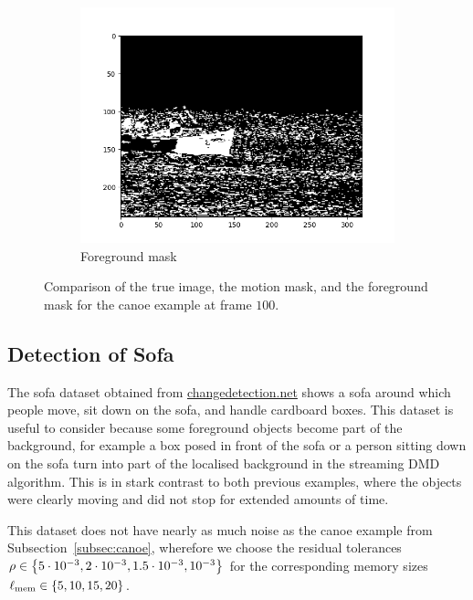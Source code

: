 \begin{figure}[!ht]
\begin{subfigure}{.3\textwidth}
        \includegraphics[width=\textwidth]{canoe_fg_frame_100.png}
        \caption{Foreground mask}
    \end{subfigure}
    \caption{Comparison of the true image, the motion mask, and the foreground mask for the canoe example at frame $100$.}\label{fig:canoe-frame-100}
\end{figure}

\subsection{Detection of Sofa}\label{subsec:sofa} %

The sofa dataset obtained from \href{changedetection.net}{changedetection.net} shows a sofa around which people move, sit down on the sofa, and handle cardboard boxes. This dataset is useful to consider because some foreground objects become part of the background, for example a box posed in front of the sofa or a person sitting down on the sofa turn into part of the localised background in the streaming DMD algorithm. This is in stark contrast to both previous examples, where the objects were clearly moving and did not stop for extended amounts of time.

This dataset does not have nearly as much noise as the canoe example from Subsection~\ref{subsec:canoe}, wherefore we choose the residual tolerances $\rho \in \left\{5 \cdot 10^{-3}, 2 \cdot 10^{-3}, 1.5 \cdot 10^{-3}, 10^{-3}\right\}$ for the corresponding memory sizes $\ell_\text{mem} \in \left\{5, 10, 15, 20\right\}$.

